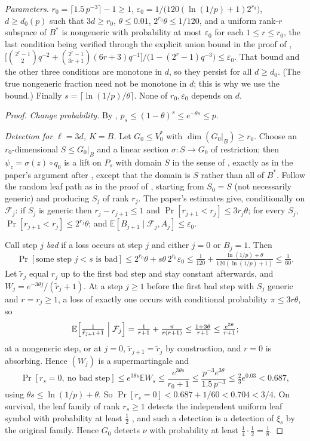 \documentclass[11pt]{amsart}
\theoremstyle{remark}
\newcommand{\E}{\mathbb E}
\begin{document}
\noindent\emph{Parameters.} $r_0=\lceil1.5\,p^{-3}\rceil-1\ge1$,
$\varepsilon_0=1/\bigl(120(\ln(1/p)+1)2^{r_0}\bigr)$, $d\ge d_0(p)$ such that $3d\ge r_0$,
$\theta\le0.01$, $2^{r_0}\theta\le1/120$, and a uniform rank-$r$ subspace of $B^*$ is nongeneric
with probability at most $\varepsilon_0$ for each $1\le r\le r_0$, the last condition being
verified through the explicit union bound in the proof of \cite[Lemma 3.6]{oai},
$\bigl[\binom{2^r-1}{2}q^{-2}+\binom{2^r-1}{3r+1}(6r+3)q^{-1}\bigr]/\bigl(1-(2^r-1)q^{-3}\bigr)\le\varepsilon_0$.
That bound and the other three conditions are monotone in $d$, so they persist for all $d\ge d_0$.
(The true nongeneric fraction need not be monotone in $d$; this is why we use the bound.) Finally
$s=\lceil\ln(1/p)/\theta\rceil$. None of $r_0,\varepsilon_0$ depends on $d$.

\begin{proof}
\emph{Change probability.} By \cite[Lemma 3.7]{oai}, $p_s\le(1-\theta)^s\le e^{-\theta s}\le p$.

\emph{Detection for $\ell=3d$, $K=B$.} Let $G_0\le V_0^*$ with $\dim(G_0|_B)\ge r_0$. Choose an
$r_0$-dimensional $S\le G_0|_B$ and a linear section $\sigma:S\to G_0$ of restriction; then
$\psi_z=\sigma(z)\circ q_0$ is a lift on $P_s$ with domain $S$ in the sense of \cite[eq.\ (3.16)]{oai},
exactly as in the paper's argument after \cite[Prop.~3.9]{oai}, except that the domain is $S$ rather
than all of $B^*$. Follow the random leaf path as in the proof of \cite[Prop.~3.9]{oai}, starting
from $S_0=S$ (not necessarily generic) and producing $S_j$ of rank $r_j$. The paper's estimates give,
conditionally on $\mathcal F_j$: if $S_j$ is generic then $r_j-r_{j+1}\le1$ and
$\Pr[r_{j+1}<r_j]\le3r_j\theta$; for every $S_j$, $\Pr[r_{j+1}<r_j]\le2^{r_j}\theta$; and
$\E[B_{j+1}\mid\mathcal F_j,A_j]\le\varepsilon_0$.

Call step $j$ \emph{bad} if a loss occurs at step $j$ and either $j=0$ or $B_j=1$. Then
\[
\Pr[\text{some step }j<s\text{ is bad}]\le2^{r_0}\theta+s\theta\,2^{r_0}\varepsilon_0
\le\tfrac1{120}+\tfrac{\ln(1/p)+\theta}{120(\ln(1/p)+1)}\le\tfrac1{60}.
\]
Let $\tilde r_j$ equal $r_j$ up to the first bad step and stay constant afterwards, and
$W_j=e^{-3\theta j}/(\tilde r_j+1)$. At a step $j\ge1$ before the first bad step with $S_j$ generic
and $r=r_j\ge1$, a loss of exactly one occurs with conditional probability $\pi\le3r\theta$, so
\[
\E\Bigl[\tfrac1{\tilde r_{j+1}+1}\Bigm|\mathcal F_j\Bigr]=\tfrac1{r+1}+\tfrac{\pi}{r(r+1)}\le\tfrac{1+3\theta}{r+1}\le\tfrac{e^{3\theta}}{r+1};
\]
at a nongeneric step, or at $j=0$, $\tilde r_{j+1}=\tilde r_j$ by construction, and $r=0$ is
absorbing. Hence $(W_j)$ is a supermartingale and
\[
\Pr[r_s=0,\ \text{no bad step}]\le e^{3\theta s}\E W_s\le\frac{e^{3\theta s}}{r_0+1}
\le\frac{p^{-3}e^{3\theta}}{1.5\,p^{-3}}\le\tfrac23e^{0.03}<0.687,
\]
using $\theta s\le\ln(1/p)+\theta$. So $\Pr[r_s=0]<0.687+1/60<0.704<3/4$. On survival, the leaf family
of rank $r_s\ge1$ detects the independent uniform leaf symbol with probability at least $\frac12$
\cite[proof of Prop.~3.9]{oai}, and such a detection is a detection of $\xi_s$ by the original
family. Hence $G_0$ detects $\nu$ with probability at least $\frac14\cdot\frac12=\frac18$.


\end{proof}
\end{document}
